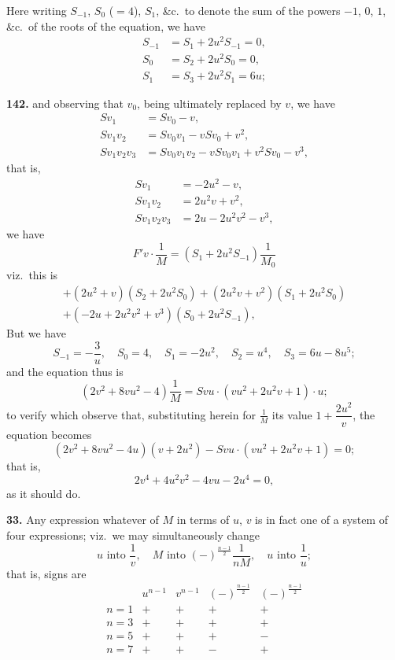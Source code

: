 \documentclass[11pt,a4paper]{article}
\theoremstyle{plain}
\begin{document}
Here writing $S_{-1}$, $S_0$ ($= 4$), $S_1$, \&c.\ to denote the sum of the powers $-1$, $0$, $1$, \&c.\ of the roots of the equation, we have
\begin{align*}
S_{-1} &= S_1 + 2u^2S_{-1} = 0, \\
S_0 &= S_2 + 2u^2S_0 = 0, \\
S_1 &= S_3 + 2u^2S_1 = 6u;
\end{align*}


\noindent\textbf{142.} and observing that $v_0$, being ultimately replaced by $v$, we have
\begin{align*}
Sv_1 &= Sv_0 - v, \\
Sv_1v_2 &= Sv_0v_1 - vSv_0 + v^2, \\
Sv_1v_2v_3 &= Sv_0v_1v_2 - vSv_0v_1 + v^2Sv_0 - v^3,
\end{align*}
that is,
\begin{align*}
Sv_1 &= -2u^2 - v, \\
Sv_1v_2 &= 2u^2v + v^2, \\
Sv_1v_2v_3 &= 2u - 2u^2v^2 - v^3,
\end{align*}
we have
\[
F'v \cdot \frac{1}{M} = (S_1 + 2u^2S_{-1})\frac{1}{M_0}
\]
viz.\ this is
\begin{multline*}
+ (2u^2 + v)(S_2 + 2u^2S_0) + (2u^2v + v^2)(S_1 + 2u^2S_0) \\
+ (-2u + 2u^2v^2 + v^3)(S_0 + 2u^2S_{-1}),
\end{multline*}
But we have
\[
S_{-1} = -\frac{3}{u}, \quad S_0 = 4, \quad S_1 = -2u^2, \quad S_2 = u^4, \quad S_3 = 6u - 8u^5;
\]
and the equation thus is
\[
(2v^2 + 8vu^2 - 4)\frac{1}{M} = Svu \cdot (vu^2 + 2u^2v + 1) \cdot u;
\]
to verify which observe that, substituting herein for $\frac{1}{M}$ its value $1 + \dfrac{2u^2}{v}$, the equation becomes
\[
(2v^2 + 8vu^2 - 4u)(v + 2u^2) - Svu \cdot (vu^2 + 2u^2v + 1) = 0;
\]
that is,
\[
2v^4 + 4u^2v^2 - 4vu - 2u^4 = 0,
\]
as it should do.

\medskip
\noindent\textbf{33.} Any expression whatever of $M$ in terms of $u$, $v$ is in fact one of a system of four expressions; viz.\ we may simultaneously change
\[
u \text{ into } \frac{1}{v}, \quad M \text{ into } (-)^{\frac{n-1}{2}}\frac{1}{nM}, \quad u \text{ into } \frac{1}{u};
\]
that is, signs are
\[
\begin{array}{c|cccc}
& u^{n-1} & v^{n-1} & (-)^{\frac{n-1}{2}} & (-)^{\frac{n-1}{2}} \\
\hline
n = 1 & + & + & + & + \\
n = 3 & + & + & + & + \\
n = 5 & + & + & + & - \\
n = 7 & + & + & - & + \\
\end{array}
\]
\end{document}
